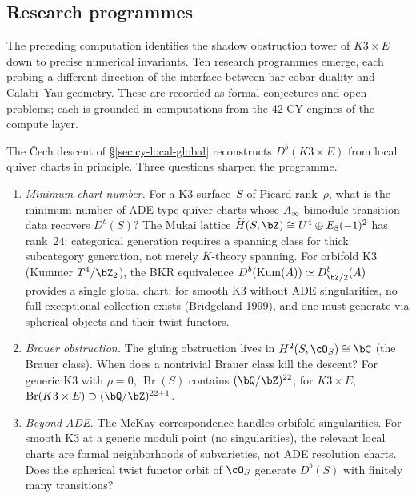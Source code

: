\subsection{Research programmes}
\label{subsec:cy-research-programmes}

The preceding computation identifies the shadow obstruction tower
of $K3 \times E$ down to precise numerical invariants. Ten research
programmes emerge, each probing a different direction of the
interface between bar-cobar duality and Calabi--Yau geometry.
These are recorded as formal conjectures and open problems;
each is grounded in computations from the $42$ CY engines
of the compute layer.

\bigskip


\begin{openproblem}
\label{op:programme-a-cy-gluing}
The \v{C}ech descent of
\S\ref{sec:cy-local-global} reconstructs $D^b(K3 \times E)$
from local quiver charts in principle. Three questions sharpen
the programme.
\begin{enumerate}[label=\textup{(A\arabic*)}]
\item \emph{Minimum chart number.} For a K3 surface~$S$ of
 Picard rank~$\rho$, what is the minimum number of
 ADE-type quiver charts whose $A_\infty$-bimodule
 transition data recovers $D^b(S)$? The Mukai lattice
 $\widetilde{H}(S,\bZ) \cong U^4 \oplus E_8(-1)^2$ has
 rank~$24$; categorical generation requires a spanning class
 for thick subcategory generation, not merely $K$-theory
 spanning. For orbifold K3 (Kummer $T^4/\bZ_2$),
 the BKR equivalence
 $D^b(\operatorname{Kum}(A)) \simeq D^b_{\bZ/2}(A)$
 provides a single global chart; for smooth K3 without
 ADE singularities, no full exceptional collection exists
 (Bridgeland 1999), and one must generate via spherical
 objects and their twist functors.
\item \emph{Brauer obstruction.} The gluing obstruction
 lives in $H^2(S, \cO_S) \cong \bC$
 (the Brauer class). When does a nontrivial Brauer
 class kill the descent? For generic K3 with $\rho = 0$,
 $\operatorname{Br}(S)$ contains $(\bQ/\bZ)^{22}$;
 for $K3 \times E$,
 $\operatorname{Br}(K3 \times E)
 \supset (\bQ/\bZ)^{22+1}$.
\item \emph{Beyond ADE.} The McKay correspondence
 handles orbifold singularities. For smooth K3 at a
 generic moduli point (no singularities), the relevant
 local charts are formal neighborhoods of subvarieties,
 not ADE resolution charts. Does the spherical twist
 functor orbit of $\cO_S$ generate $D^b(S)$ with
 finitely many transitions?
\end{enumerate}
\end{openproblem}

